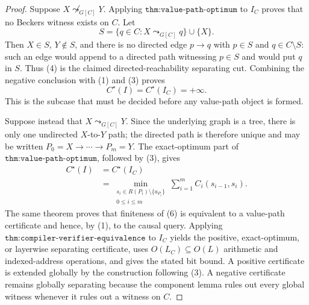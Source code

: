 \documentclass{article}
\begin{document}
\begin{proof}
Suppose \(X\not\leadsto_{G[C]}Y\).  Applying \(\texttt{thm:value-path-optimum}\) to \(I_C\) proves that no Beckers witness exists on \(C\).  Let
\[
 S=\{q\in C:X\leadsto_{G[C]}q\}\cup\{X\}.                               \tag{4}
\]
Then \(X\in S\), \(Y\notin S\), and there is no directed edge \(p\to q\) with \(p\in S\) and \(q\in C\setminus S\): such an edge would append to a directed path witnessing \(p\in S\) and would put \(q\) in \(S\).  Thus (4) is the claimed directed-reachability separating cut.  Combining the negative conclusion with (1) and (3) proves
\[
 C^\star(I)=C^\star(I_C)=+\infty.                                         \tag{5}
\]
This is the subcase that must be decided before any value-path object is formed.

Suppose instead that \(X\leadsto_{G[C]}Y\).  Since the underlying graph is a tree, there is only one undirected \(X\)-to-\(Y\) path; the directed path is therefore unique and may be written \(P_0=X\to\cdots\to P_m=Y\).  The exact-optimum part of \(\texttt{thm:value-path-optimum}\), followed by (3), gives
\[
 \begin{aligned}
 C^\star(I)
 &=C^\star(I_C)\\
 &=\min_{\substack{s_i\in R(P_i)\setminus\{a_{P_i}\}\\0\le i\le m}}
   \sum_{i=1}^{m}C_i(s_{i-1},s_i).                         \tag{6}
 \end{aligned}
\]
The same theorem proves that finiteness of (6) is equivalent to a value-path certificate and hence, by (1), to the causal query.  Applying \(\texttt{thm:compiler-verifier-equivalence}\) to \(I_C\) yields the positive, exact-optimum, or layerwise separating certificate, uses \(O(L_C)\subseteq O(L)\) arithmetic and indexed-address operations, and gives the stated bit bound.  A positive certificate is extended globally by the construction following (3).  A negative certificate remains globally separating because the component lemma rules out every global witness whenever it rules out a witness on \(C\).


\end{proof}
\end{document}
